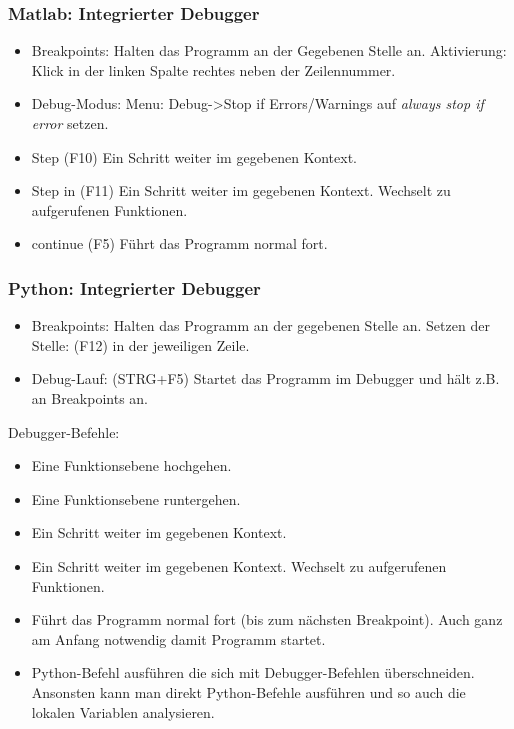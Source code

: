 \documentclass[hyperref={xetex}]{beamer}
\begin{document}
\begin{frame}[fragile]\frametitle{Matlab: Integrierter Debugger}
\begin{itemize}
 \item \alert{Breakpoints}: Halten das Programm an der Gegebenen Stelle an. Aktivierung: Klick in der linken Spalte rechtes neben der Zeilennummer. 
 \item \alert{Debug-Modus}: Menu: Debug->Stop if Errors/Warnings auf \textit{always stop if error} setzen.
 \item \alert{Step} (F10) Ein Schritt weiter im gegebenen Kontext.
 \item \alert{Step in} (F11) Ein Schritt weiter im gegebenen Kontext. Wechselt zu aufgerufenen Funktionen. 
\item \alert{continue} (F5) Führt das Programm normal fort.
\end{itemize}
\end{frame}


\begin{frame}[fragile]\frametitle{Python: Integrierter Debugger}
\begin{itemize}
  \item \alert{Breakpoints}: Halten das Programm an der gegebenen Stelle an. Setzen der Stelle: (F12) in der jeweiligen Zeile.
  \item \alert{Debug-Lauf}: (STRG+F5) Startet das Programm im Debugger und hält z.B. an Breakpoints an.
\end{itemize}
Debugger-Befehle:
\begin{itemize}
  \item {} Eine Funktionsebene hochgehen.
  \item {} Eine Funktionsebene runtergehen.
  \item {} Ein Schritt weiter im gegebenen Kontext.
 \item {} Ein Schritt weiter im gegebenen Kontext. Wechselt zu aufgerufenen Funktionen. 
\item {} Führt das Programm normal fort (bis zum nächsten Breakpoint). Auch ganz am Anfang notwendig damit Programm startet.
\item {} Python-Befehl ausführen die sich mit Debugger-Befehlen überschneiden. Ansonsten kann man direkt Python-Befehle ausführen und so auch die lokalen Variablen analysieren.
\end{itemize}
\end{frame}
\end{document}

